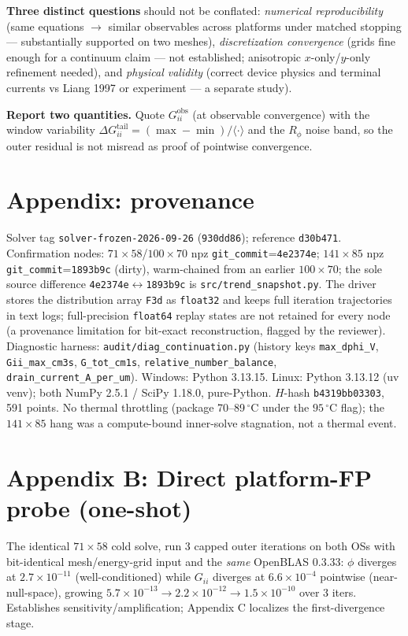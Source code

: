 \documentclass[11pt]{article}
\newcommand{\ten}[1]{\times 10^{#1}}
\begin{document}
\textbf{Three distinct questions} should not be conflated: \emph{numerical reproducibility} (same equations $\to$ similar observables across platforms under matched stopping --- substantially supported on two meshes), \emph{discretization convergence} (grids fine enough for a continuum claim --- not established; anisotropic $x$-only/$y$-only refinement needed), and \emph{physical validity} (correct device physics and terminal currents vs Liang 1997 or experiment --- a separate study).

\textbf{Report two quantities.} Quote $G_{ii}^{\mathrm{obs}}$ (at observable convergence) with the window variability $\Delta G_{ii}^{\mathrm{tail}}=(\max-\min)/\langle\cdot\rangle$ and the $R_\phi$ noise band, so the outer residual is not misread as proof of pointwise convergence.

\section*{Appendix: provenance}
Solver tag \texttt{solver-frozen-2026-09-26} (\texttt{930dd86}); reference \texttt{d30b471}. Confirmation nodes: $71\times58$/$100\times70$ npz \texttt{git\_commit}=\texttt{4e2374e}; $141\times85$ npz \texttt{git\_commit}=\texttt{1893b9c} (dirty), warm-chained from an earlier $100\times70$; the sole source difference \texttt{4e2374e}$\leftrightarrow$\texttt{1893b9c} is \texttt{src/trend\_snapshot.py}. The driver stores the distribution array \texttt{F3d} as \texttt{float32} and keeps full iteration trajectories in text logs; full-precision \texttt{float64} replay states are not retained for every node (a provenance limitation for bit-exact reconstruction, flagged by the reviewer). Diagnostic harness: \texttt{audit/diag\_continuation.py} (history keys \texttt{max\_dphi\_V}, \texttt{Gii\_max\_cm3s}, \texttt{G\_tot\_cm1s}, \texttt{relative\_number\_balance}, \texttt{drain\_current\_A\_per\_um}). Windows: Python 3.13.15. Linux: Python 3.13.12 (uv venv); both NumPy 2.5.1 / SciPy 1.18.0, pure-Python. $H$-hash \texttt{b4319bb03303}, 591 points. No thermal throttling (package 70--89\,$^\circ$C under the $95\,^\circ$C flag); the $141\times85$ hang was a compute-bound inner-solve stagnation, not a thermal event.

\section*{Appendix B: Direct platform-FP probe (one-shot)}
The identical $71\times58$ cold solve, run 3 capped outer iterations on both OSs with bit-identical mesh/energy-grid input and the \emph{same} OpenBLAS 0.3.33: $\phi$ diverges at $2.7\ten{-11}$ (well-conditioned) while $G_{ii}$ diverges at $6.6\ten{-4}$ pointwise (near-null-space), growing $5.7\ten{-13}\to2.2\ten{-12}\to1.5\ten{-10}$ over 3 iters. Establishes sensitivity/amplification; Appendix C localizes the first-divergence stage.
\end{document}

